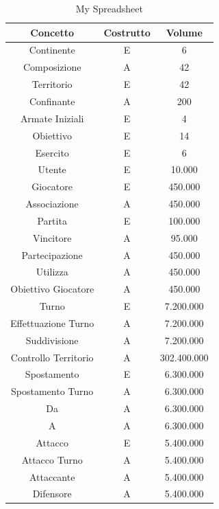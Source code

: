 \documentclass[a4paper,12pt]{report}
\begin{document}
\begin{table}[H]
    \caption{My Spreadsheet}
    \centering
    \begin{tabular}{|c|c|c|}
        \hline
        \textbf{Concetto}& \textbf{Costrutto}& \textbf{Volume}\\ \hline
        Continente & E & 6 \\ \hline 
        Composizione & A & 42 \\ \hline 
        Territorio & E & 42 \\ \hline 
        Confinante & A & 200 \\ \hline 
        Armate Iniziali & E & 4 \\ \hline
        Obiettivo & E & 14 \\ \hline 
        Esercito & E & 6 \\ \hline 
        Utente & E & 10.000 \\ \hline
        Giocatore & E & 450.000 \\ \hline 
        Associazione & A & 450.000 \\ \hline 
        Partita & E & 100.000 \\ \hline 
        Vincitore & A & 95.000 \\ \hline 
        Partecipazione & A & 450.000 \\ \hline 
        Utilizza & A & 450.000 \\ \hline 
        Obiettivo Giocatore & A & 450.000 \\ \hline 
        Turno & E & 7.200.000 \\ \hline
        Effettuazione Turno & A & 7.200.000 \\ \hline
        Suddivisione & A & 7.200.000 \\ \hline
        Controllo Territorio & A & 302.400.000 \\ \hline
        Spostamento & E & 6.300.000 \\ \hline 
        Spostamento Turno & A & 6.300.000 \\ \hline 
        Da & A & 6.300.000 \\ \hline 
        A & A & 6.300.000 \\ \hline 
        Attacco & E & 5.400.000 \\ \hline 
        Attacco Turno & A & 5.400.000 \\ \hline 
        Attaccante & A & 5.400.000 \\ \hline 
        Difensore & A & 5.400.000 \\ \hline 
    \end{tabular}
\end{table}
\end{document}
